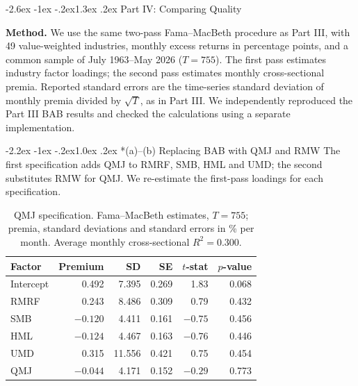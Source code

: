 \documentclass[11pt]{article}
\makeatletter
\renewcommand\section{\@startsection{section}{1}{0pt}%
  {-2.6ex \@plus -1ex \@minus -.2ex}{1.3ex \@plus .2ex}%
  {\normalfont\scshape\large\color{psink}}}   %
\renewcommand\subsection{\@startsection{subsection}{2}{0pt}%
  {-2.2ex \@plus -1ex \@minus -.2ex}{1.0ex \@plus .2ex}%
  {\normalfont\bfseries\normalsize\color{psink}}}
\makeatother
\begin{document}

\section{Part IV: Comparing Quality}

\noindent\textbf{Method.} We use the same two-pass Fama--MacBeth procedure as Part III,
with 49 value-weighted industries, monthly excess returns in percentage points,
and a common sample of July 1963--May 2026 ($T=755$). The first pass estimates
industry factor loadings; the second pass estimates monthly cross-sectional
premia. Reported standard errors are the time-series standard deviation of
monthly premia divided by $\sqrt{T}$, as in Part III. We independently reproduced
the Part III BAB results and checked the calculations using a separate implementation.

\subsection*{(a)--(b) Replacing BAB with QMJ and RMW}
The first specification adds QMJ to RMRF, SMB, HML and UMD; the second substitutes
RMW for QMJ. We re-estimate the first-pass loadings for each specification.

\begin{table}[H]
\centering
\caption{QMJ specification. Fama--MacBeth estimates, $T=755$; premia, standard deviations and standard errors in \% per month. Average monthly cross-sectional $R^2=0.300$.}
\label{tab:ps7_qmj}
\begin{tabular}{lrrrrr}
\toprule
Factor & Premium & SD & SE & $t$-stat & $p$-value \\
\midrule
Intercept & 0.492 & 7.395 & 0.269 & 1.83 & 0.068 \\
RMRF & 0.243 & 8.486 & 0.309 & 0.79 & 0.432 \\
SMB & $-0.120$ & 4.411 & 0.161 & $-0.75$ & 0.456 \\
HML & $-0.124$ & 4.467 & 0.163 & $-0.76$ & 0.446 \\
UMD & 0.315 & 11.556 & 0.421 & 0.75 & 0.454 \\
QMJ & $-0.044$ & 4.171 & 0.152 & $-0.29$ & 0.773 \\
\bottomrule
\end{tabular}
\end{table}
\end{document}
